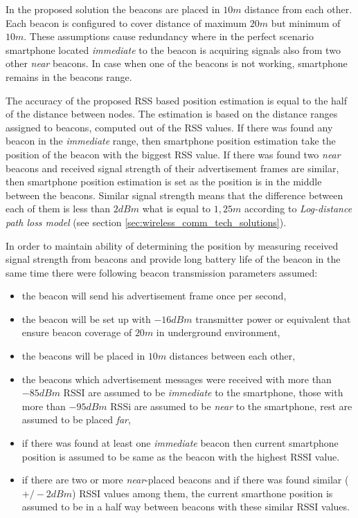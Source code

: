 \documentclass[../main.tex]{subfiles}
\begin{document}
In the proposed solution the beacons are placed in $10m$ distance from each other. Each beacon is configured to cover distance of maximum $20 m$ but minimum of $10 m$. These assumptions cause redundancy where in the perfect scenario smartphone located \textit{immediate} to the beacon is acquiring signals also from two other \textit{near} beacons. In case when one of the beacons is not working, smartphone remains in the beacons range.

The accuracy of the proposed RSS based position estimation is equal to the half of the distance between nodes. The estimation is based on the distance ranges assigned to beacons, computed out of the RSS values. If there was found any beacon in the \textit{immediate} range, then smartphone position estimation take the position of the beacon with the biggest RSS value. If there was found two \textit{near} beacons and received signal strength of their advertisement frames are similar, then smartphone position estimation is set as the position is in the middle between the beacons. Similar signal strength means that the difference between each of them is less than $2 dBm$ what is equal to $1,25 m$ according to \textit{Log-distance path loss model} (see section \ref{sec:wireless_comm_tech_solutions}).

In order to maintain ability of determining the position by measuring received signal strength from beacons and provide long battery life of the beacon in the same time there were following beacon transmission parameters assumed:
\begin{itemize}
	\item the beacon will send his advertisement frame once per second,
	\item the beacon will be set up with $-16 dBm$ transmitter power or equivalent that ensure beacon coverage of $20 m$ in underground environment,
	\item the beacons will be placed in $10 m$ distances between each other,
	\item the beacons which advertisement messages were received with more than $-85 dBm$ RSSI are assumed to be \textit{immediate} to the smartphone, those with more than $-95 dBm$ RSSi are assumed to be \textit{near} to the smartphone, rest are assumed to be placed \textit{far},
	\item if there was found at least one \textit{immediate} beacon then current smartphone position is assumed to be same as the beacon with the highest RSSI value.
	\item if there are two or more \textit{near}-placed beacons and if there was found similar ($+/- 2 dBm$) RSSI values among them, the current smarthone position is assumed to be in a half way between beacons with these similar RSSI values.
\end{itemize}
\end{document}
